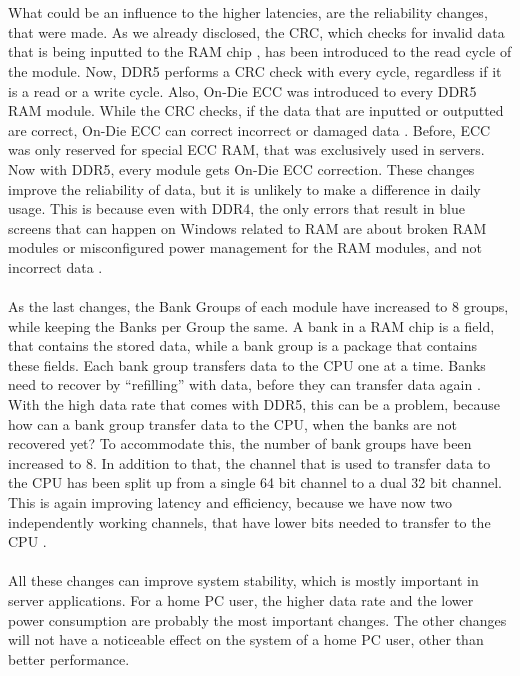 \\
\\
What could be an influence to the higher latencies, are the reliability changes, that were made. As we already disclosed, the CRC, which checks for invalid data that is being inputted to the RAM chip \parencite{crc_def}, has been introduced to the read cycle of the module. Now, DDR5 performs a CRC check with every cycle, regardless if it is a read or a write cycle. Also, On-Die ECC was introduced to every DDR5 RAM module. While the CRC checks, if the data that are inputted or outputted are correct, On-Die ECC can correct incorrect or damaged data \parencite{ddr5_overview_kingston}. Before, ECC was only reserved for special ECC RAM, that was exclusively used in servers. Now with DDR5, every module gets On-Die ECC correction. These changes improve the reliability of data, but it is unlikely to make a difference in daily usage. This is because even with DDR4, the only errors that result in blue screens that can happen on Windows related to RAM are about broken RAM modules or misconfigured power management for the RAM modules, and not incorrect data \parencite{bluescreens}. 
\\
\\
As the last changes, the Bank Groups of each module have increased to 8 groups, while keeping the Banks per Group the same. A bank in a RAM chip is a field, that contains the stored data, while a bank group is a package that contains these fields. Each bank group transfers data to the CPU one at a time. Banks need to recover by “refilling” with data, before they can transfer data again \parencite{bank_groups}. With the high data rate that comes with DDR5, this can be a problem, because how can a bank group transfer data to the CPU, when the banks are not recovered yet? To accommodate this, the number of bank groups have been increased to 8. In addition to that, the channel that is used to transfer data to the CPU has been split up from a single 64 bit channel to a dual 32 bit channel. This is again improving latency and efficiency, because we have now two independently working channels, that have lower bits needed to transfer to the CPU \parencite{ddr5_overview_kingston}.
\\
\\
All these changes can improve system stability, which is mostly important in server applications. For a home PC user, the higher data rate and the lower power consumption are probably the most important changes. The other changes will not have a noticeable effect on the system of a home PC user, other than better performance.

